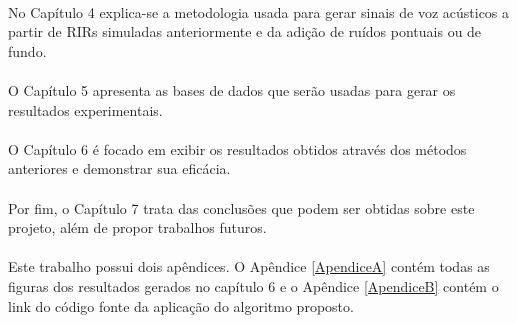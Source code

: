 \paragraph{}No Capítulo 4 explica-se a metodologia usada para gerar sinais de voz acústicos a partir de RIRs simuladas anteriormente e da adição
de ruídos pontuais ou de fundo.

\paragraph{}O Capítulo 5 apresenta as bases de dados que serão usadas para gerar os resultados experimentais.

\paragraph{}O Capítulo 6 é focado em exibir os resultados obtidos através dos métodos anteriores e demonstrar sua eficácia.

\paragraph{}Por fim, o Capítulo 7 trata das conclusões que podem ser obtidas sobre este projeto, além de propor trabalhos futuros.

\paragraph{}Este trabalho possui dois apêndices. O Apêndice \ref{ApendiceA} contém todas as figuras dos resultados gerados no capítulo 6
e o Apêndice \ref{ApendiceB} contém o link do código fonte da aplicação do algoritmo proposto. 